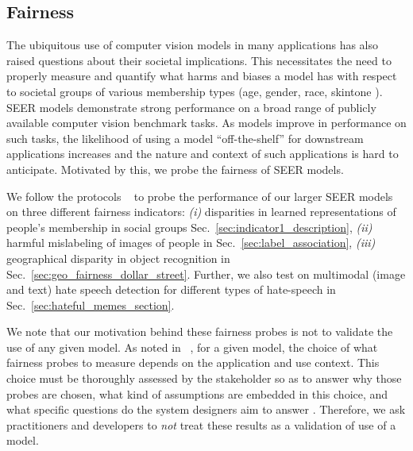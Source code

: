 \documentclass[10pt,twocolumn,letterpaper]{article}
\newcommand{\seer}{SEER\xspace}
\begin{document}
\subsection{Fairness}
\label{sec:fairness_section}

The ubiquitous use of computer vision models in many applications has also raised questions about their societal implications.
This necessitates the need to properly measure and quantify what harms and biases a model has with respect to societal groups of various membership types (\eg age, gender, race, skintone \etc). 
\seer models demonstrate strong performance on a broad range of publicly available computer vision benchmark tasks.
As models improve in performance on such tasks, the likelihood of using a model ``off-the-shelf'' for downstream applications increases and the nature and context of such applications is hard to anticipate. 
Motivated by this, we probe the fairness of \seer models. 

We follow the protocols \etal~\cite{goyal2022fairness} to probe the performance of our larger SEER models on three different fairness indicators:
\textit{(i)} disparities in learned representations of people’s membership in social groups Sec.~\ref{sec:indicator1_description},
\textit{(ii)} harmful mislabeling of images of people in Sec.~\ref{sec:label_association},
\textit{(iii)} geographical disparity in object recognition in Sec.~\ref{sec:geo_fairness_dollar_street}. Further, we also test on multimodal (image and text) hate speech detection for different types of hate-speech in Sec.~\ref{sec:hateful_memes_section}. 

We note that our motivation behind these fairness probes is not to validate the use of any given model.
As noted in ~\cite{goyal2022fairness}, for a given model, the choice of what fairness probes to measure depends on the application and use context.
This choice must be thoroughly assessed by the stakeholder so as to answer why those probes are chosen, what kind of assumptions are embedded in this choice, and what specific questions do the system designers aim to answer \cite{paml, kalluri2020don}. 
Therefore, we ask practitioners and developers to \textit{not} treat these results as a validation of use of a model.
\end{document}
